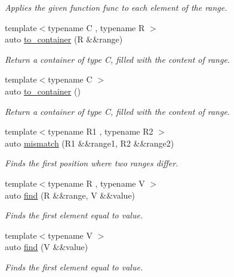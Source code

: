 \begin{DoxyCompactItemize}
\begin{DoxyCompactList}\small\item\em Applies the given function func to each element of the range. \end{DoxyCompactList}\item 
{\footnotesize template$<$typename C , typename R $>$ }\\auto \mbox{\hyperlink{namespace_r_a_h___n_a_m_e_s_p_a_c_e_aaeda276f5ef0a84c8ab43dc6ab213457}{to\+\_\+container}} (R \&\&range)
\begin{DoxyCompactList}\small\item\em Return a container of type C, filled with the content of range. \end{DoxyCompactList}\item 
{\footnotesize template$<$typename C $>$ }\\auto \mbox{\hyperlink{namespace_r_a_h___n_a_m_e_s_p_a_c_e_a1f7c872e0258890901febfd0ed8caabd}{to\+\_\+container}} ()
\begin{DoxyCompactList}\small\item\em Return a container of type C, filled with the content of range. \end{DoxyCompactList}\item 
{\footnotesize template$<$typename R1 , typename R2 $>$ }\\auto \mbox{\hyperlink{namespace_r_a_h___n_a_m_e_s_p_a_c_e_a267247366bb3abea3e383e7dd3c5f2d7}{mismatch}} (R1 \&\&range1, R2 \&\&range2)
\begin{DoxyCompactList}\small\item\em Finds the first position where two ranges differ. \end{DoxyCompactList}\item 
{\footnotesize template$<$typename R , typename V $>$ }\\auto \mbox{\hyperlink{namespace_r_a_h___n_a_m_e_s_p_a_c_e_a4b865606b3c78c61a732f4fef4e0576b}{find}} (R \&\&range, V \&\&value)
\begin{DoxyCompactList}\small\item\em Finds the first element equal to value. \end{DoxyCompactList}\item 
{\footnotesize template$<$typename V $>$ }\\auto \mbox{\hyperlink{namespace_r_a_h___n_a_m_e_s_p_a_c_e_a95fc53c7921b52d24f79ac55711673b3}{find}} (V \&\&value)
\begin{DoxyCompactList}\small\item\em Finds the first element equal to value. \end{DoxyCompactList}\item 

\end{DoxyCompactItemize}
